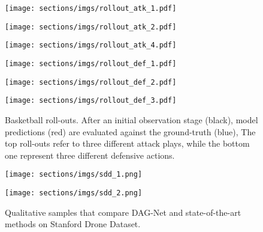 \documentclass[10pt,a4paper,conference]{IEEEtran}
\begin{document}
\begin{figure}[!t]
  \centering
  \vspace{4 pt}
  \begin{minipage}[b]{0.15\textwidth}
   \texttt{[image: sections/imgs/rollout\_atk\_1.pdf]}
  \end{minipage}
  \begin{minipage}[b]{0.15\textwidth}
    \texttt{[image: sections/imgs/rollout\_atk\_2.pdf]}
  \end{minipage}
  \begin{minipage}[b]{0.15\textwidth}
   \texttt{[image: sections/imgs/rollout\_atk\_4.pdf]}
  \end{minipage}
  \begin{minipage}[b]{0.15\textwidth}
   \texttt{[image: sections/imgs/rollout\_def\_1.pdf]}
  \end{minipage}
  \begin{minipage}[b]{0.15\textwidth}
    \texttt{[image: sections/imgs/rollout\_def\_2.pdf]}
  \end{minipage}
  \begin{minipage}[b]{0.15\textwidth}
   \texttt{[image: sections/imgs/rollout\_def\_3.pdf]}
  \end{minipage}
  \caption{Basketball roll-outs. After an initial observation stage (black), model predictions (red) are evaluated against the ground-truth (blue),  The top roll-outs refer to three different attack plays, while the bottom one represent three different defensive actions.}
  \label{fig:basketball_rollouts}
\end{figure}


\begin{figure}[!t]
  \centering
  \begin{minipage}[b]{0.241\textwidth}
   \texttt{[image: sections/imgs/sdd\_1.png]}
  \end{minipage}
  \begin{minipage}[b]{0.241\textwidth}
    \texttt{[image: sections/imgs/sdd\_2.png]}
  \end{minipage}
  \caption{Qualitative samples that compare DAG-Net and state-of-the-art methods on Stanford Drone Dataset.}
  \label{fig:sdd_predictions}
\end{figure}
\end{document}
